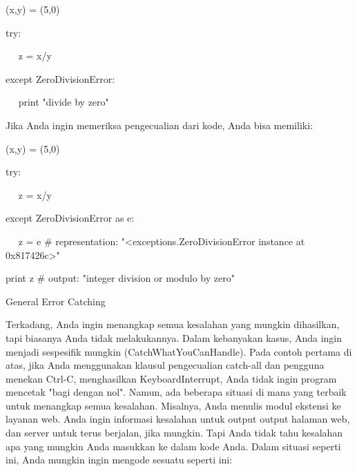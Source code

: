 {\fontsize{10pt}{10pt}\selectfont  (x,y) = (5,0)} 

{\fontsize{10pt}{10pt}\selectfont  try:} 

{\fontsize{10pt}{10pt}\selectfont ~~ z = x/y} 


{\fontsize{10pt}{10pt}\selectfont  except ZeroDivisionError:}


{\fontsize{10pt}{10pt}\selectfont ~~ print "divide by zero"} 

\vspace{10pt}

Jika Anda ingin memeriksa pengecualian dari kode, Anda bisa memiliki: 

\vspace{12pt}
 
\vspace{12pt}

\vspace{12pt}

{\fontsize{10pt}{10pt}\selectfont  (x,y) = (5,0)} 


{\fontsize{10pt}{10pt}\selectfont  try:} 


{\fontsize{10pt}{10pt}\selectfont ~~ z = x/y} 


{\fontsize{10pt}{10pt}\selectfont  except ZeroDivisionError as e:} 

{\fontsize{10pt}{10pt}\selectfont ~~ z = e  $  \#  $ representation: "<exceptions.ZeroDivisionError instance at 0x817426c>"} 


{\fontsize{10pt}{10pt}\selectfont  print z  $  \#  $ output: "integer division or modulo by zero"} 

\vspace{16pt}

General Error Catching 

\vspace{12pt}
 
 \hspace*{0.64in} Terkadang, Anda ingin menangkap semua kesalahan yang mungkin dihasilkan, tapi biasanya Anda tidak melakukannya. Dalam kebanyakan kasus, Anda ingin menjadi sespesifik mungkin (CatchWhatYouCanHandle). Pada contoh pertama di atas, jika Anda menggunakan klausul pengecualian catch-all dan pengguna menekan Ctrl-C, menghasilkan KeyboardInterrupt, Anda tidak ingin program mencetak "bagi dengan nol". Namun, ada beberapa situasi di mana yang terbaik untuk menangkap semua kesalahan. Misalnya, Anda menulis modul ekstensi ke layanan web. Anda ingin informasi kesalahan untuk output output halaman web, dan server untuk terus berjalan, jika mungkin. Tapi Anda tidak tahu kesalahan apa yang mungkin Anda masukkan ke dalam kode Anda. Dalam situasi seperti ini, Anda mungkin ingin mengode sesuatu seperti ini: 
\vspace{12pt}



